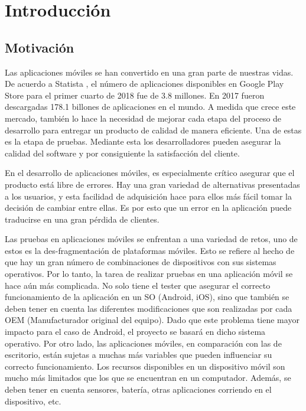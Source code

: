 %
\chapter{Introducción}
\label{sec:intro}

\section{Motivación}

Las aplicaciones móviles se han convertido en una gran parte de nuestras vidas. De acuerdo a Statista \cite{MobileStatista}, el número de aplicaciones disponibles en Google Play Store para el primer cuarto de 2018 fue de 3.8 millones. En 2017 fueron descargadas 178.1 billones de aplicaciones en el mundo. A medida que crece este mercado, también lo hace la necesidad de mejorar cada etapa del proceso de desarrollo para entregar un producto de calidad de manera eficiente. Una de estas es la etapa de pruebas. Mediante esta los desarrolladores pueden asegurar la calidad del software y por consiguiente la satisfacción del cliente.

En el desarrollo de aplicaciones móviles, es especialmente crítico asegurar que el producto está libre de errores. Hay una gran variedad de alternativas presentadas a los usuarios, y esta facilidad de adquisición hace para ellos más fácil tomar la decisión de cambiar entre ellas. Es por esto que un error en la aplicación puede traducirse en una gran pérdida de clientes.

Las pruebas en aplicaciones móviles se enfrentan a una variedad de retos, uno de estos es la des-fragmentación de plataformas móviles. Esto se refiere al hecho de que hay un gran número de combinaciones de dispositivos con sus sistemas operativos. Por lo tanto, la tarea de realizar pruebas en una aplicación móvil se hace aún más complicada. No solo tiene el tester que asegurar el correcto funcionamiento de la aplicación en un SO (Android, iOS), sino que también se deben tener en cuenta las diferentes modificaciones que son realizadas por cada OEM (Manufacturador original del equipo). Dado que este problema tiene mayor impacto para el caso de Android, el proyecto se basará en dicho sistema operativo.
Por otro lado, las aplicaciones móviles, en comparación con las de escritorio, están sujetas a muchas más variables que pueden influenciar su correcto funcionamiento. Los recursos disponibles en un dispositivo móvil son mucho más limitados que los que se encuentran en un computador. Además, se deben tener en cuenta sensores, batería, otras aplicaciones corriendo en el dispositivo, etc.

